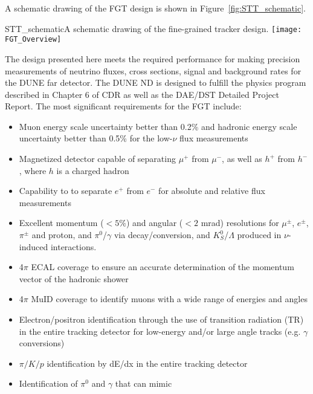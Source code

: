 A schematic drawing of the FGT design is shown in Figure~\ref{fig:STT_schematic}. 
\begin{cdrfigure}{STT_schematic}{A schematic drawing of the fine-grained tracker design.}
\texttt{[image: FGT\_Overview]}
\end{cdrfigure}
The design presented here meets the required performance for making precision measurements of 
neutrino fluxes, cross sections, signal and background rates for the DUNE far detector. 
The DUNE ND is designed to fulfill the physics program described in Chapter 6 of CDR \volphys %
as well as the DAE/DST Detailed Project Report\cite{DPR}. The most significant 
requirements\cite{ND-REQ1,ND-REQ2} for the FGT include:  
\begin{itemize}
\item Muon energy scale uncertainty better than 0.2\% and hadronic
  energy scale uncertainty better than 0.5\% for the low-$\nu$ flux
  measurements
\item Magnetized detector capable of separating $\mu^+$
  from $\mu^-$, as well as $h^+$ from $h^-$, where $h$ is a charged
  hadron
\item Capability to to separate $e^+$ from $e^-$ for absolute and
  relative flux measurements
\item Excellent momentum ($<5\%$) and angular ($<2$ mrad) resolutions
  for $\mu^{\pm}$, $e^{\pm}$, $\pi^{\pm}$ and proton, and
  $\pi^0$/$\gamma$ via decay/conversion, and $K^0_S$/$\Lambda$
  produced in $\nu$-induced interactions.
\item 4$\pi$ ECAL coverage to ensure an accurate determination of the
  momentum vector of the hadronic shower
\item 4$\pi$ MuID coverage to identify muons with a wide range of
  energies and angles
\item Electron/positron identification through the use of transition
  radiation (TR) in the entire tracking detector for low-energy and/or
  large angle tracks (e.g. $\gamma$ conversions)
\item $\pi/K/p$ identification by dE/dx in the entire tracking
  detector
\item Identification of $\pi^0$ and $\gamma$ that can mimic

\end{itemize}
